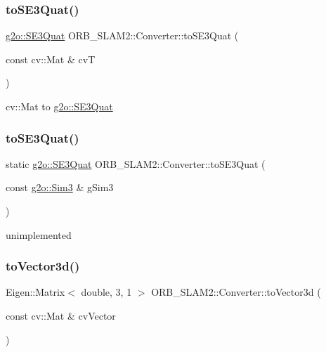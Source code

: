 \subsubsection{\texorpdfstring{to\+S\+E3\+Quat()}{toSE3Quat()}\hspace{0.1cm}{\footnotesize\ttfamily [1/2]}}
{\footnotesize\ttfamily \mbox{\hyperlink{classg2o_1_1_s_e3_quat}{g2o\+::\+S\+E3\+Quat}} O\+R\+B\+\_\+\+S\+L\+A\+M2\+::\+Converter\+::to\+S\+E3\+Quat (\begin{DoxyParamCaption}\item[{const cv\+::\+Mat \&}]{cvT }\end{DoxyParamCaption})\hspace{0.3cm}{\ttfamily [static]}}

cv\+::\+Mat to \mbox{\hyperlink{classg2o_1_1_s_e3_quat}{g2o\+::\+S\+E3\+Quat}} \mbox{\label{class_o_r_b___s_l_a_m2_1_1_converter_ac76ddd3b4d9a7e364e5cc72cfe483247}} 
\subsubsection{\texorpdfstring{to\+S\+E3\+Quat()}{toSE3Quat()}\hspace{0.1cm}{\footnotesize\ttfamily [2/2]}}
{\footnotesize\ttfamily static \mbox{\hyperlink{classg2o_1_1_s_e3_quat}{g2o\+::\+S\+E3\+Quat}} O\+R\+B\+\_\+\+S\+L\+A\+M2\+::\+Converter\+::to\+S\+E3\+Quat (\begin{DoxyParamCaption}\item[{const \mbox{\hyperlink{structg2o_1_1_sim3}{g2o\+::\+Sim3}} \&}]{g\+Sim3 }\end{DoxyParamCaption})\hspace{0.3cm}{\ttfamily [static]}}

unimplemented \mbox{\label{class_o_r_b___s_l_a_m2_1_1_converter_a65fccab585e29d1acbf4c23e5ce69bdc}} 
\subsubsection{\texorpdfstring{to\+Vector3d()}{toVector3d()}\hspace{0.1cm}{\footnotesize\ttfamily [1/2]}}
{\footnotesize\ttfamily Eigen\+::\+Matrix$<$ double, 3, 1 $>$ O\+R\+B\+\_\+\+S\+L\+A\+M2\+::\+Converter\+::to\+Vector3d (\begin{DoxyParamCaption}\item[{const cv\+::\+Mat \&}]{cv\+Vector }\end{DoxyParamCaption})\hspace{0.3cm}{\ttfamily [static]}}

